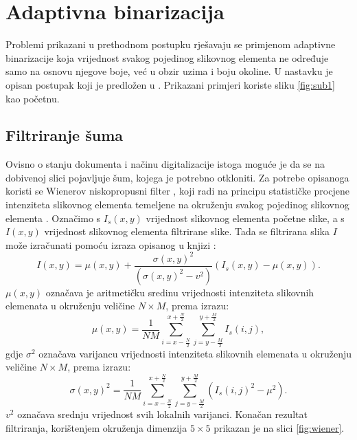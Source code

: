 \documentclass[times, utf8, zavrsni, numeric]{fer}
\begin{document}
\section{Adaptivna binarizacija}
Problemi prikazani u prethodnom postupku rješavaju se primjenom adaptivne binarizacije koja vrijednost svakog pojedinog slikovnog elementa ne određuje samo na osnovu njegove boje, već u obzir uzima i boju okoline.
U nastavku je opisan postupak koji je predložen u \cite{AdaptiveBinarization}.
Prikazani primjeri koriste sliku \ref{fig:sub1} kao početnu.

\subsection{Filtriranje šuma}
Ovisno o stanju dokumenta i načinu digitalizacije istoga moguće je da se na dobivenoj slici pojavljuje šum, kojega je potrebno otkloniti.
Za potrebe opisanoga koristi se Wienerov niskopropusni filter \cite{book:Two-Dimensional-Signal-Image-Processing}, koji radi na principu statističke procjene intenziteta slikovnog elementa temeljene na okruženju svakog pojedinog slikovnog elementa \cite{AdaptiveBinarization}.
Označimo s $I_s(x, y)$ vrijednost slikovnog elementa početne slike, a s $I(x, y)$ vrijednost slikovnog elementa filtrirane slike.
Tada se filtrirana slika $I$ može izračunati pomoću izraza opisanog u knjizi \cite{book:Two-Dimensional-Signal-Image-Processing}:
\[I(x, y) = \mu(x, y) + \frac{\sigma(x, y)^2}{(\sigma(x, y)^2 - v^2)}(I_s(x, y) - \mu(x, y)).\]
$\mu(x, y)$ označava je aritmetičku sredinu vrijednosti intenziteta slikovnih elemenata u okruženju veličine $N\times M$, prema izrazu:
\[\mu(x, y) = \frac{1}{NM} 
    \displaystyle \sum_{i = x-\frac{N}{2}}^{x+\frac{N}{2}}
    \displaystyle \sum_{j = y-\frac{M}{2}}^{y+\frac{M}{2}}
I_s(i, j),\]
gdje $\sigma^2$ označava varijancu vrijednosti intenziteta slikovnih elemenata u okruženju veličine $N\times M$, prema izrazu:
\[\sigma(x, y)^2 = \frac{1}{NM} 
    \displaystyle \sum_{i = x-\frac{N}{2}}^{x+\frac{N}{2}}
    \displaystyle \sum_{j = y-\frac{M}{2}}^{y+\frac{M}{2}}
(I_s(i, j)^2 - \mu^2).\]
$v^2$ označava srednju vrijednost svih lokalnih varijanci.
Konačan rezultat filtriranja, korištenjem okruženja dimenzija $5\times 5$ prikazan je na slici \ref{fig:wiener}.
\end{document}
